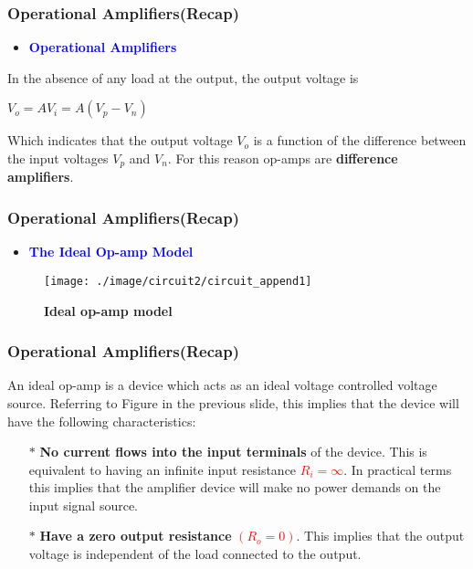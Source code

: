 \documentclass{beamer}
\newcommand{\blue}[1]{\textcolor{blue}{#1}}
\newcommand{\red}[1]{\textcolor{red}{#1}}
\begin{document}

\begin{frame}
\frametitle{Operational Amplifiers(Recap)}

\begin{itemize}
  \item {\bf \blue{Operational Amplifiers}}
\end{itemize}

\centerline{In the absence of any load at the output, the output voltage is }
\centerline{$V_o = AV_i = A(V_p - V_n)$}

\begin{block}{}
Which indicates that the output voltage $V_o$ is a function of the difference between the input voltages $V_p$ and $V_n$. For this reason op-amps are {\bf difference amplifiers}. 
\end{block}

\end{frame}



\begin{frame}
\frametitle{Operational Amplifiers(Recap)}

\begin{itemize}
  \item {\bf \blue{The Ideal Op-amp Model}}
\end{itemize}
\begin{figure}[H]
  \centering
  \texttt{[image: ./image/circuit2/circuit\_append1]}
  \caption{{\bf Ideal op-amp model}}
\end{figure}

\end{frame}


\begin{frame}
\frametitle{Operational Amplifiers(Recap)}
An ideal op-amp is a device which acts as an ideal voltage
controlled voltage source. Referring to Figure in the previous slide, this implies that the device will have the
following characteristics:
\begin{itemize}
  \item[$\ast$] {\bf No current flows into the input terminals} of the device. This is equivalent to having an infinite input resistance \red{\bf $R_i = \infty$}. In practical terms this implies that the amplifier device will make no power demands on the input signal source.
  \item[$\ast$] {\bf Have a zero output resistance} \red{$(R_o=0)$}. This implies that the output voltage is independent of the load connected to the output.
\end{itemize}
\end{frame}
\end{document}

